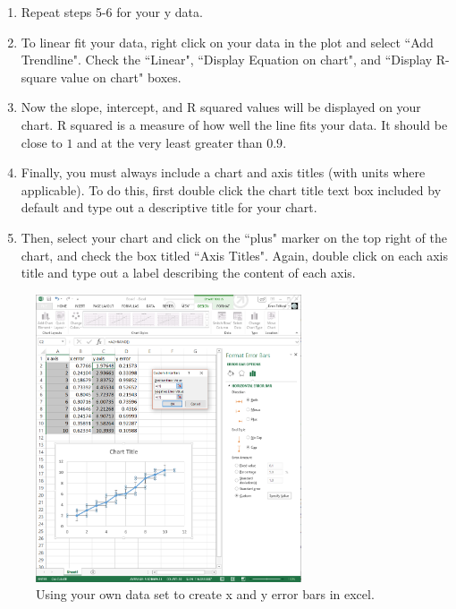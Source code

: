 \begin{enumerate}
\item Repeat steps 5-6 for your y data.
\item To linear fit your data, right click on your data in the plot and select ``Add Trendline". Check the ``Linear", ``Display Equation on chart", and ``Display R-square value on chart" boxes.
\item Now the slope, intercept, and R squared values will be displayed on your chart. R squared is a measure of how well the line fits your data. It should be close to $1$ and at the very least greater than $0.9$.
\item Finally, you must always include a chart and axis titles (with units where applicable). To do this, first double click the chart title text box included by default and type out a descriptive title for your chart.
\item Then, select your chart and click on the ``plus" marker on the top right of the chart, and check the box titled ``Axis Titles". Again, double click on each axis title and type out a label describing the content of each axis. 
\end{enumerate}

\begin{figure}[h!]
\centering
\includegraphics[height=0.4\textheight, width=0.7\textwidth]{./Exp1-2/pic/image5.png}
\caption{Using your own data set to create x and y error bars in excel.}
\label{fig:excel2}
\end{figure}

